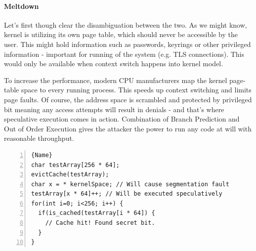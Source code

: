 \documentclass{article}
\begin{document}
\paragraph{Meltdown}
Let's first though clear the disambiguation between the two. As we might know, kernel is utilizing its own page table, which should never be accessible by the user. This might hold information such as passwords, keyrings or other privileged information - important for running of the system (e.g. TLS connections). This would only be available when context switch happens into kernel model.

To increase the performance, modern CPU manufacturers map the kernel page-table space to every running process. This speeds up context switching and limits page faults. Of course, the address space is scrambled and protected by privileged bit meaning any access attempts will result in denials - and that's where speculative execution comes in action. Combination of Branch Prediction and Out of Order Execution gives the attacker the power to run any code at will with reasonable throughput.

\begin{lstlisting}[caption=Meltdown PoC,frame=tlrb, numbers=left, firstnumber=1]{Name}
char testArray[256 * 64];
evictCache(testArray);
char x = * kernelSpace; // Will cause segmentation fault
testArray[x * 64]++; // Will be executed speculatively
for(int i=0; i<256; i++) {
  if(is_cached(testArray[i * 64]) {
    // Cache hit! Found secret bit.
  }
}
\end{lstlisting}
\end{document}
